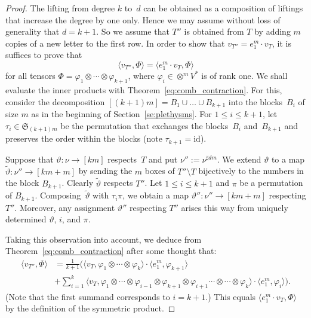 \documentclass[11pt]{amsart}
\def\ot{\otimes}
\def\id{\mathrm{id}}
\newcommand{\aS}{\ensuremath{\mathfrak{S}}}
\numberwithin{equation}{section}
\begin{document}
\begin{proof} %
The lifting from degree $k$ to~$d$ can be obtained as a composition of 
liftings that increase the degree by one only.  Hence we may assume without loss of generality that $d=k+1$. 
So we assume that $T''$ is obtained from $T$ by adding $m$ copies of a new letter to the first row. 
In order to show that $v_{T''} = e_1^m\cdot v_T$, it is suffices to prove that 
\begin{equation}\label{eq:vT''-eval}
 \langle v_{T''}, \Phi \rangle = \langle e_1^m \cdot v_T, \Phi\rangle 
\end{equation}
for all tensors $\Phi=\varphi_1\otimes \cdots \otimes \varphi_{k+1}$,
where $\varphi_i\in \otimes^m V^*$ is of rank one.  
We shall evaluate the inner products with Theorem~\ref{eq:comb_contraction}. 
For this, consider the decomposition
$[(k+1)m] = B_1 \cup\ldots\cup B_{k+1}$ into the blocks~$B_i$ 
of size $m$ as in the beginning of Section~\ref{se:plethysms}. 
For $1\le i\le k+1$, let $\tau_i\in\aS_{(k+1)m}$ be the permutation that 
exchanges the blocks~$B_i$ and~$B_{k+1}$ and preserves the order 
within the blocks (note $\tau_{k+1}=\id$). 

Suppose that $\vartheta\colon\nu\to [km]$ respects~$T$ and 
put $\nu'':=\nu^{\sharp dm}$.
We extend $\vartheta$ to a map 
$\tilde{\vartheta}\colon\nu''\to [km+m]$ 
by sending the $m$ boxes of $T''\setminus T$ bijectively to the
numbers in the block $B_{k+1}$.
Clearly $\tilde\vartheta$ respects $T''$. 
Let $1\le i \le k+1$ and $\pi$ be a permutation of $B_{k+1}$.  
Composing~$\tilde{\vartheta}$ with $\tau_i \pi$,  
we obtain a map 
$\vartheta''\colon\nu''\to [km+m]$ 
respecting $T''$. Moreover, any assignment $\vartheta''$ respecting $T''$ 
arises this way from uniquely determined $\vartheta$, $i$, and $\pi$. 

Taking this observation into account, we deduce from 
Theorem~\ref{eq:comb_contraction} after some thought that: 
\begin{equation*}
\begin{split}
 \langle v_{T''}, \Phi \rangle &= 
  \frac{1}{k+1}\Big(
 \langle v_T, \varphi_1\ot\cdots\ot \varphi_k \rangle \cdot \langle  e_1^m, \varphi_{k+1}\rangle  \\
  &+ \sum_{i=1}^{k} \langle v_T, \varphi_1\ot\cdots\ot \varphi_{i-1}\ot \varphi_{k+1}\ot \varphi_{i+1}\cdots\ot\cdots\ot \varphi_k \rangle 
    \cdot \langle  e_1^m, \varphi_{i}\rangle \Big) .
\end{split}
\end{equation*}
(Note that the first summand corresponds to $i=k+1$.)
This equals $\langle e_1^m\cdot v_T , \Phi \rangle$ 
by the definition of the symmetric product. 
\end{proof}
\end{document}
